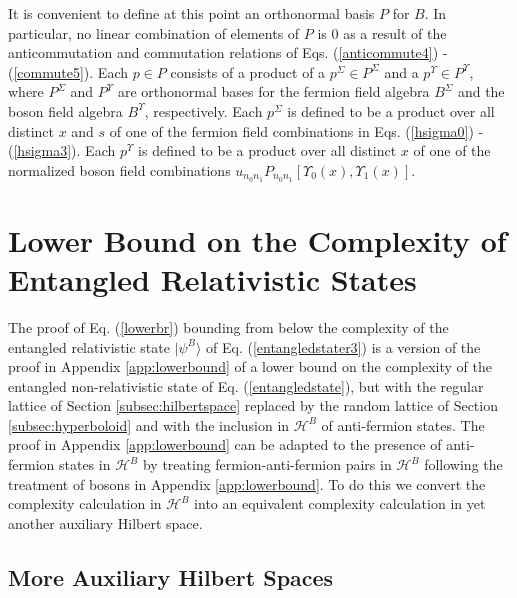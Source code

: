 \documentclass[twocolumn,amsmath,amssymb]{revtex4-1}
\begin{document}
It is convenient to define at this point an orthonormal basis $P$ for $B$.
In particular, no linear combination
of elements of $P$ is 0 as a result of the anticommutation and
commutation relations of Eqs. (\ref{anticommute4}) - (\ref{commute5}).
Each $p \in P$ consists of a product of a $p^\Sigma \in P^\Sigma$ and
a $p^\Upsilon \in P^\Upsilon$, where
$P^\Sigma$ and $P^\Upsilon$ are orthonormal bases for the fermion
field algebra $B^\Sigma$ and the boson field algebra $B^\Upsilon$, respectively.
Each $p^\Sigma$ is defined to be a product over all distinct $x$ and
$s$ of one of the fermion field combinations in Eqs. (\ref{hsigma0}) - (\ref{hsigma3}).
Each $p^\Upsilon$ is defined to be a product over all distinct $x$ of one of the normalized boson field
combinations $u_{n_0 n_1} P_{n_0 n_1}[\Upsilon_0(x),\Upsilon_1(x)]$.



\section{\label{app:lowerboundr} Lower Bound on the Complexity of Entangled Relativistic States}


The proof of Eq. (\ref{lowerbr}) bounding from below the
complexity of the entangled relativistic state $|\psi^B \rangle $ of Eq. (\ref{entangledstater3}) 
is a version of the proof in Appendix \ref{app:lowerbound} of a lower bound
on the complexity of the entangled non-relativistic state of Eq. (\ref{entangledstate}),
but with the regular lattice of Section \ref{subsec:hilbertspace} replaced by
the random lattice of Section \ref{subsec:hyperboloid}
and with the inclusion in $\mathcal{H}^B$ of anti-fermion states.
The proof in Appendix \ref{app:lowerbound}
can be adapted 
to the presence of anti-fermion states in $\mathcal{H}^B$
by treating fermion-anti-fermion pairs in $\mathcal{H}^B$
following the treatment of bosons in Appendix \ref{app:lowerbound}.
To do this we convert the complexity
calculation in $\mathcal{H}^B$ into an equivalent complexity
calculation in yet another auxiliary Hilbert space.



\subsection{\label{subsec:morehilbertspace} More Auxiliary Hilbert Spaces}
\end{document}
